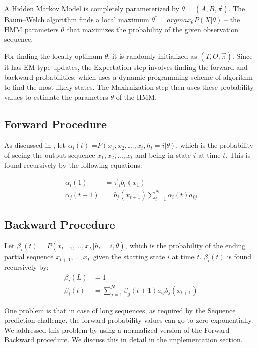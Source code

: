 \documentclass[letterpaper]{article}
\begin{document}
A Hidden Markov Model is completely parameterized by  $\theta = (A,B,\vec \pi)$. The Baum–Welch algorithm finds a local maximum $\theta^{*} = argmax_{\theta} P(X|\theta)$ -- the HMM parameters $\theta$ that maximizes the probability of the given observation sequence.
 
For finding the locally optimum $\theta$, it is randomly initialized as $(T, O, \vec \pi)$. Since it has EM type updates, the Expectation step involves finding the forward and backward probabilities, which uses a dynamic programming scheme of algorithm to find the most likely states. The Maximization step then uses these probability values to estimate the parameters $\theta$ of the HMM.

\subsection{Forward Procedure}
As discussed in \cite{rab1}, let $\alpha_{i}(t)$ =$P(x_{1},x_{2},...,x_{t},h_{t}={i}|\theta)$, which is the probability of seeing the output sequence $x_{1},x_{2},...,x_{t}$ and being in state $i$ at time $t$. This is found recursively by the following equations:

\begin{align*}
	\alpha_{i}(1)   & = \vec \pi_{i} b_{i}(x_{1})                         \\
	\alpha_{j}(t+1) & = b_{j}(x_{t+1}) \sum_{i=1}^{N}\alpha_{i}(t) a_{ij} 
\end{align*}

\subsection{Backward Procedure}
Let $\beta_{i}(t)=P(x_{t+1},...,x_{L}|h_{t}=i,\theta)$, which is the probability of the ending partial sequence $x_{t+1},...,x_{L}$ given the starting state $i$ at time $t$. $\beta_{i}(t)$ is found recursively by:
\begin{align*}
	\beta_{i}(L) & = 1                                                 \\
	\beta_{i}(t) & = \sum_{j=1}^N \beta_{j}(t+1) a_{ij} b_{j}(x_{t+1}) 
\end{align*}
 
One problem is that in case of long sequences, as required by the Sequence prediction challenge, the forward probability values can go to zero exponentially. We addressed this problem by using a normalized version of the Forward-Backward procedure. We discuss this in detail in the implementation section.
\end{document}
